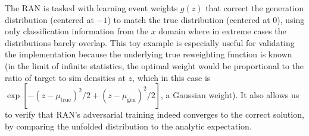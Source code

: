 {{            The RAN is tasked with learning event weights $g(z)$ that correct the generation distribution (centered at $-1$) to match the true distribution (centered at 0), using only classification information from the $x$ domain where in extreme cases the distributions barely overlap.
            This toy example is especially useful for validating the implementation because the underlying true reweighting function is known (in the limit of infinite statistics, the optimal weight would be proportional to the ratio of target to sim densities at $z$, which in this case is $\exp[-(z-\mu_{\text{true}})^2/2 + (z-\mu_{\text{gen}})^2/2]$, a Gaussian weight). It also allows us to verify that RAN’s adversarial training indeed converges to the correct solution, by comparing the unfolded distribution to the analytic expectation.

}}
